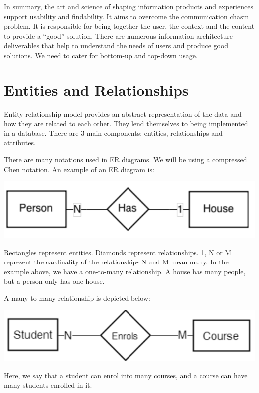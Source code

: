 \documentclass[a4paper, openany]{memoir}
\begin{document}
In summary, the art and science of shaping information products and experiences support usability and findability. It aims to overcome the communication chasm problem. It is responsible for being together the user, the context and the content to provide a ``good'' solution. There are numerous information architecture deliverables that help to understand the needs of users and produce good solutions. We need to cater for bottom-up and top-down usage.
\newpage

\section{Entities and Relationships}
Entity-relationship model provides an abstract representation of the data and how they are related to each other. They lend themselves to being implemented in a database. There are 3 main components: entities, relationships and attributes.

There are many notations used in ER diagrams. We will be using a compressed Chen notation. An example of an ER diagram is:
\begin{center}
    \includegraphics[scale=0.8]{src/L10I1.PNG}
\end{center}
Rectangles represent entities. Diamonds represent relationships. 1, N or M represent the cardinality of the relationship- N and M mean many. In the example above, we have a one-to-many relationship. A house has many people, but a person only has one house.

A many-to-many relationship is depicted below:
\begin{center}
    \includegraphics[scale=0.8]{src/L10I2.PNG}
\end{center}
Here, we say that a student can enrol into many courses, and a course can have many students enrolled in it.
\end{document}
